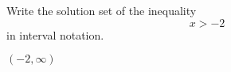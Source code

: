 
Write the solution set of the inequality
\[x> -2\]
in interval notation.

\begin{solution}
$(-2, \infty)$
\end{solution}
